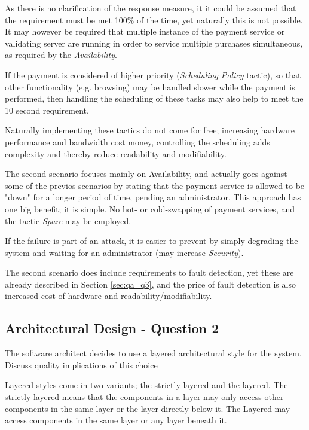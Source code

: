 As there is no clarification of the response measure, it it could be assumed that the requirement must be met 100\% of the time, yet naturally this is not possible. It may however be required that multiple instance of the payment service or validating server are running in order to service multiple purchases simultaneous, as required by the \emph{Availability}.

If the payment is considered of higher priority (\emph{Scheduling Policy} tactic), so that other functionality (e.g. browsing) may be handled slower while the payment is performed, then handling the scheduling of these tasks may also help to meet the 10 second requirement.

Naturally implementing these tactics do not come for free; increasing hardware performance and bandwidth cost money, controlling the scheduling adds complexity and thereby reduce readability and modifiability.

The second scenario focuses mainly on Availability, and actually goes against some of the previos scenarios by stating that the payment service is allowed to be "down" for a longer period of time, pending an administrator. This approach has one big benefit; it is simple. No hot- or cold-swapping of payment services, and the tactic \emph{Spare} may be employed.

If the failure is part of an attack, it is easier to prevent by simply degrading the system and waiting for an administrator (may increase \emph{Security}).

The second scenario does include requirements to fault detection, yet these are already described in Section \ref{sec:qa_q3}, and the price of fault detection is also increased cost of hardware and readability/modifiability.

\subsection{Architectural Design - Question 2}

\begin{question}
The software architect decides to use a layered architectural
style for the system. Discuss quality implications of this choice
\end{question}

Layered styles come in two variants; the strictly layered and the layered. The strictly layered means that the components in a layer may only access other components in the same layer or the layer directly below it. The Layered may access components in the same layer or any layer beneath it.

